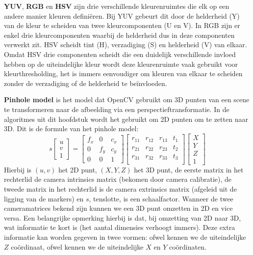 \textbf{YUV}, \textbf{RGB} en \textbf{HSV} zijn drie verschillende kleurenruimtes die elk op een andere manier kleuren defini\"eren. Bij YUV gebeurt dit door de helderheid (Y) van de kleur te scheiden van twee kleurcomponenten (U en V). In RGB zijn er enkel drie kleurcomponenten waarbij de helderheid dus in deze componenten verwerkt zit. HSV scheidt tint (H), verzadiging (S) en helderheid (V) van elkaar. Omdat HSV drie componenten scheidt die een duidelijk verschillende invloed hebben op de uiteindelijke kleur wordt deze kleurenruimte vaak gebruikt voor kleurthresholding, het is immers eenvoudiger om kleuren van elkaar te scheiden zonder de verzadiging of de helderheid te be\"invloeden.

\textbf{Pinhole model} is het model dat OpenCV gebruikt om 3D punten van een scene te transformeren naar de afbeelding via een perspectieftransformatie. In de algoritmes uit dit hoofdstuk wordt het gebruikt om 2D punten om te zetten naar 3D. Dit is de formule van het pinhole model:
$$
s
\begin{bmatrix}
	u \\ 
	v \\
	1
\end{bmatrix} 
=
\begin{bmatrix}
	f_x & 0 & c_x \\ 
	0 & f_y & c_y \\
	0 & 0 & 1
\end{bmatrix} 
\begin{bmatrix}
	r_{11} & r_{12} & r_{13} & t_1 \\ 
	r_{21} & r_{22} & r_{23} & t_2 \\
	r_{31} & r_{32} & r_{33} & t_3 \\
\end{bmatrix}
\begin{bmatrix}
	X \\ 
	Y \\
	Z \\
	1
\end{bmatrix}
$$
Hierbij is $(u,v)$ het 2D punt, $(X,Y,Z)$ het 3D punt, de eerste matrix in het rechterlid de camera intrinsics matrix (bekomen door camera calibratie), de tweede matrix in het rechterlid is de camera extrinsics matrix (afgeleid uit de ligging van de markers) en $s$, tenslotte, is een schaalfactor. Wanneer de twee cameramatrices bekend zijn kunnen we een 3D punt omzetten in 2D en vice versa. Een belangrijke opmerking hierbij is dat, bij omzetting van 2D naar 3D, wat informatie te kort is (het aantal dimensies verhoogt immers). Deze extra informatie kan worden gegeven in twee vormen: ofwel kennen we de uiteindelijke $Z$ co\"ordinaat, ofwel kennen we de uiteindelijke $X$ en $Y$ co\"ordinaten.

